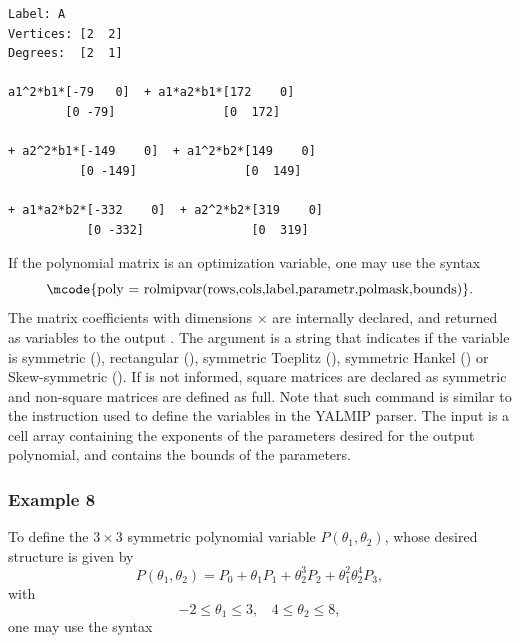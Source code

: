 \documentclass[english,11pt]{article}
\theoremstyle{break} \theorembodyfont{\small\rm}
\begin{document}
\begin{minipage}{13.0cm}
\begin{lstlisting}[rulecolor=\color{red}]
Label: A
Vertices: [2  2]
Degrees:  [2  1]
 
a1^2*b1*[-79   0]  + a1*a2*b1*[172    0]  
        [0 -79]               [0  172]   
        
+ a2^2*b1*[-149    0]  + a1^2*b2*[149    0]  
          [0 -149]               [0  149]    
          
+ a1*a2*b2*[-332    0]  + a2^2*b2*[319    0]                   
           [0 -332]               [0  319]                     
\end{lstlisting}
\end{minipage}
\vspace{0.2cm}

If the polynomial matrix is an optimization variable, one may use the syntax
\[
\mbox{\mcode{poly = rolmipvar(rows,cols,label,parametr,polmask,bounds)}}.
\]
The matrix coefficients with dimensions  $\times$ 
 are internally declared, and returned as  variables
to the output . The argument 
is a string that indicates if the variable is symmetric (), 
rectangular (), 
symmetric Toeplitz (), symmetric
Hankel () or Skew-symmetric ().
If  is not informed, square matrices are declared as symmetric and 
non-square matrices are defined as full.
Note that such command is similar to the  instruction
used to define the variables in the YALMIP parser. The input  is a 
cell array containing the exponents of the parameters desired for the output polynomial,
and  contains the bounds of the parameters.

\subsubsection*{Example 8}
To define the $3 \times 3$ symmetric polynomial variable $P(\theta_1,\theta_2)$, whose desired
structure is given by
\[
P(\theta_1,\theta_2) = P_0 + \theta_1P_1 + \theta_2^3P_2 + \theta_1^2\theta_2^4P_3,
\]
with
\[
 -2 \leq \theta_1 \leq 3, ~~~  ~ 4 \leq \theta_2 \leq 8,
\]
one may use the syntax

\vspace{0.5cm}%
\begin{minipage}{18.5cm}
\end{minipage}
\vspace{0.2cm}
\end{document}
